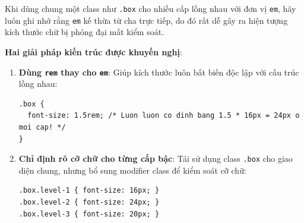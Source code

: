 \documentclass[11pt,oneside]{book}
\newcommand{\thd}[1]{\textcolor{white}{\textbf{\strut #1}}}
\newcommand{\codeinline}[1]{\textcolor{accentOrange}{\texttt{#1}}}
\begin{document}
\begin{prettyTableBox}
\sffamily\small
{}
\end{prettyTableBox}

\begin{warnBox}
Khi dùng chung một class như \codeinline{.box} cho nhiều cấp lồng nhau với đơn vị \codeinline{em}, hãy luôn ghi nhớ rằng \codeinline{em} kế thừa từ cha trực tiếp, do đó rất dễ gây ra hiện tượng kích thước chữ bị phóng đại mất kiểm soát.

\textbf{Hai giải pháp kiến trúc được khuyến nghị}:
\begin{enumerate}[leftmargin=1.5em, itemsep=2pt, parsep=0pt]
    \item \textbf{Dùng \codeinline{rem} thay cho \codeinline{em}}: Giúp kích thước luôn bất biến độc lập với cấu trúc lồng nhau:
\begin{lstlisting}[language=CSS3]
.box {
  font-size: 1.5rem; /* Luon luon co dinh bang 1.5 * 16px = 24px o moi cap! */
}
\end{lstlisting}
    \item \textbf{Chỉ định rõ cỡ chữ cho từng cấp bậc}: Tái sử dụng class \codeinline{.box} cho giao diện chung, nhưng bổ sung modifier class để kiểm soát cỡ chữ:
\begin{lstlisting}[language=CSS3]
.box.level-1 { font-size: 16px; }
.box.level-2 { font-size: 24px; }
.box.level-3 { font-size: 20px; }
\end{lstlisting}
\end{enumerate}
\end{warnBox}
\end{document}
